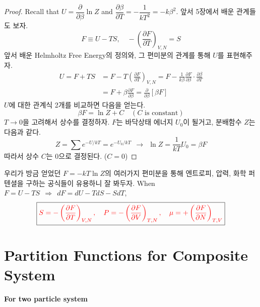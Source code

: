 \documentclass{article}
\begin{document}
\begin{proof}
    Recall that $U = \dfrac{\partial}{\partial \beta } \ln Z$ and $\dfrac{\partial \beta}{\partial T} = -\dfrac{1}{kT^2} = -k\beta^2$. 앞서 5장에서 배운 관계들도 보자.
    \begin{equation}
        F \equiv U - TS, \quad - \left( \frac{\partial F}{\partial T} \right)_{V,N} = S
    \end{equation}
    앞서 배운 Helmholtz Free Energy의 정의와, 그 편미분의 관계를 통해 $U$를 표현해주자. 
    \begin{align} \nonumber
        U = F + TS &= F - T \left( \frac{\partial F}{\partial T} \right)_{V,N} = F - \frac{1}{k \beta} \frac{\partial F}{\partial \beta} \cdot \frac{\partial \beta}{\partial T}\\
        &= F + \beta \frac{\partial F}{\partial \beta} = \frac{\partial}{\partial \beta} [\beta F]
    \end{align}
    $U$에 대한 관계식 2개를 비교하면 다음을 얻는다.
    \begin{equation}
        \beta F = \ln Z + C \quad (C\text{ is constant})
    \end{equation}
    $T \rightarrow 0$을 고려해서 상수를 결정하자. $F$는 바닥상태 에너지 $U_0$이 될거고, 분배함수 $Z$는 다음과 같다.
    \begin{equation}
        Z = \sum e^{-U/kT} = e^{-U_0 / kT} \ \ \rightarrow \ \ \ln Z = \frac{1}{kT} U_0 = \beta F
    \end{equation}
    따라서 상수 $C$는 0으로 결정된다. ($C=0$)
\end{proof}

\vspace{2mm}
\color{red}
우리가 방금 얻었던 $F=-kT\ln Z$의 여러가지 편미분을 통해 엔트로피, 압력, 화학 퍼텐셜을 구하는 공식들이 유용하니 잘 봐두자. When $F = U - TS \ \ \Rightarrow \ \ dF = dU - TdS - SdT$, \color{black}
\begin{equation}
    \boxed{ \color{red} S = -\left( \frac{\partial F}{\partial T} \right)_{V, N}, \quad P = -\left( \frac{\partial F}{\partial V} \right)_{T, N}, \quad \mu = +\left( \frac{\partial F}{\partial N} \right)_{T, V}} \color{black}
\end{equation}

\newpage
\color{black}
\section{Partition Functions for Composite System}

\textbf{For two particle system}
\end{document}

